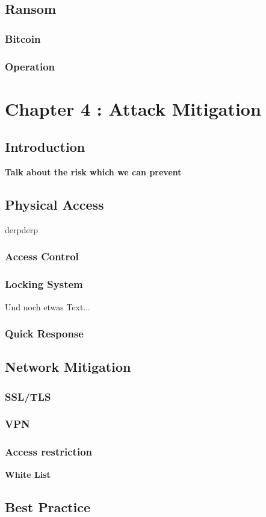 \documentclass[twosided,a4,10pt]{article}
\begin{document}
\begin{multicols}{2}
\subsection{Ransom}
 \subsubsection{Bitcoin}
 \lipsum[1]
 \subsubsection{Operation}
 \lipsum[1]



\section{Chapter 4 : Attack Mitigation }

\subsection{Introduction}
 \textbf{Talk about the risk which we can prevent}
 \lipsum[1]



\subsection{Physical Access}
derpderp
 \subsubsection{Access Control}
 \lipsum[1]

 \subsubsection{Locking System}
 Und noch etwas Text... \cite{muster} \newline
 \lipsum[1]
 \subsubsection{Quick Response}
 \lipsum[1]

 
\subsection{Network Mitigation}
 \subsubsection{SSL/TLS}
 \lipsum[1]
 \subsubsection{VPN}
 \lipsum[1]
 \subsubsection{Access restriction}
 \textbf{White List}
 \lipsum[1]
 
\subsection{Best Practice}
 \lipsum[2]

 
 


\end{multicols}
\end{document}
